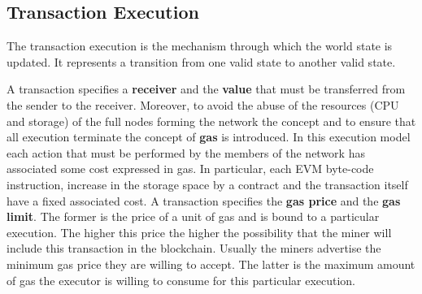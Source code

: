 \subsection{Transaction Execution}
\label{sec:tx-execution}
The transaction execution is the mechanism through which the world state is
updated. It represents a transition from one
valid state to another valid state.

A transaction specifies a \textbf{receiver} and the \textbf{value} that must be
transferred from the sender to the receiver.
Moreover, to avoid the abuse of the resources
(CPU and storage) of the full nodes forming the network the concept and to
ensure that all execution terminate the concept of \textbf{gas} is introduced.
In this execution model each action that must be performed by the members
of the network has associated some cost expressed in gas.
In particular, each EVM byte-code instruction, increase in the storage
space by a contract and the transaction itself have a fixed associated cost.
A transaction specifies the \textbf{gas price} and the \textbf{gas limit}. 
The former is the price of a unit of gas and is bound to a particular execution.
The higher this price the higher the
possibility that the miner will include this transaction in the blockchain.
Usually the miners advertise the minimum gas price they are willing to accept.
The latter is the maximum amount of gas the executor is willing to consume for
this particular execution.

